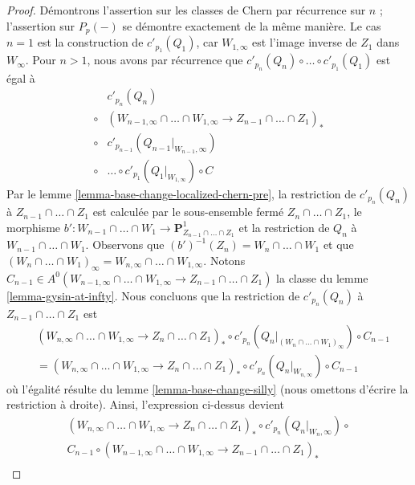 \begin{proof}
Démontrons l'assertion sur les classes de Chern par récurrence sur $n$ ;
l'assertion sur $P_p(-)$ se démontre exactement de la même manière.
Le cas $n = 1$ est la construction de $c'_{p_1}(Q_1)$, car
$W_{1, \infty}$ est l'image inverse de $Z_1$ dans $W_\infty$.
Pour $n > 1$, nous avons par récurrence que
$c'_{p_n}(Q_n) \circ \ldots \circ c'_{p_1}(Q_1)$ est égal à
$$
\begin{aligned}
{}&c'_{p_n}(Q_n) \\
{}\circ{}&
(W_{n - 1, \infty} \cap \ldots \cap W_{1, \infty} \to
Z_{n - 1} \cap \ldots \cap Z_1)_* \\
{}\circ{}&
c'_{p_{n - 1}}(Q_{n - 1}|_{W_{n - 1}, \infty}) \\
{}\circ{}& \ldots \circ
c'_{p_1}(Q_1|_{W_{1, \infty}})
\circ C
\end{aligned}
$$
Par le lemme \ref{lemma-base-change-localized-chern-pre}, la restriction de
$c'_{p_n}(Q_n)$ à $Z_{n - 1} \cap \ldots \cap Z_1$ est calculée par
le sous-ensemble fermé $Z_n \cap \ldots \cap Z_1$, le morphisme
$b' : W_{n - 1} \cap \ldots \cap W_1 \to
\mathbf{P}^1_{Z_{n - 1} \cap \ldots \cap Z_1}$
et la restriction de $Q_n$ à $W_{n - 1} \cap \ldots \cap W_1$.
Observons que $(b')^{-1}(Z_n) = W_n \cap \ldots \cap W_1$
et que $(W_n \cap \ldots \cap W_1)_\infty =
W_{n, \infty} \cap \ldots \cap W_{1, \infty}$.
Notons $C_{n - 1} \in A^0(W_{n - 1, \infty} \cap \ldots \cap W_{1, \infty} \to
Z_{n - 1} \cap \ldots \cap Z_1)$ la classe du lemme \ref{lemma-gysin-at-infty}.
Nous concluons que la restriction de $c'_{p_n}(Q_n)$ à
$Z_{n - 1} \cap \ldots \cap Z_1$ est
\begin{align*}
&
(W_{n, \infty} \cap \ldots \cap W_{1, \infty} \to Z_n \cap \ldots \cap Z_1)_*
\circ
c'_{p_n}(Q_n|_{(W_n \cap \ldots \cap W_1)_\infty})
\circ
C_{n - 1} \\
& =
(W_{n, \infty} \cap \ldots \cap W_{1, \infty} \to Z_n \cap \ldots \cap Z_1)_*
\circ
c'_{p_n}(Q_n|_{W_{n, \infty}})
\circ
C_{n - 1}
\end{align*}
où l'égalité résulte du lemme \ref{lemma-base-change-silly}
(nous omettons d'écrire la restriction à droite). Ainsi, l'expression ci-dessus devient
\begin{align*}
(W_{n, \infty} \cap \ldots \cap W_{1, \infty} \to
Z_n \cap \ldots \cap Z_1)_* \circ
c'_{p_n}(Q_n|_{W_n, \infty}) \circ \\
C_{n - 1} \circ
(W_{n - 1, \infty} \cap \ldots \cap W_{1, \infty} \to
Z_{n - 1} \cap \ldots \cap Z_1)_* \\

\end{align*}
\end{proof}
